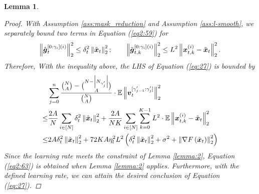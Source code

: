 \documentclass{article}
\theoremstyle{plain}
\newtheorem{lemma}[theorem]{Lemma}
\theoremstyle{definition}
\theoremstyle{remark}
\newcommand{\E}{\mathbb{E}}
\renewcommand{\eqref}[1]{Equation (\ref{#1})}
\newcommand{\bracket}[1]{\left(#1\right)}
\newcommand{\norm}[1]{\left\|#1\right\|_2^2}
\begin{document}
\begin{lemma}
\begin{proof}
With Assumption \ref{ass:mask_reduction} and Assumption \ref{ass:l-smooth}, we separately bound two terms in \eqref{eq2:59} for
\begin{align}
\norm{ \hat{\boldsymbol{g}}^{[0:\gamma_{i}] (i)}_{t} } \leq \delta_t^2 \norm{\x{t}}; \qquad \norm{ \tilde{\boldsymbol{g}}^{[0:\gamma_{i}] (i)}_{t, k} } \leq L^2 \norm{\x{i}{t}{k} - \x{t}}.
\end{align}
Therefore, With the inequality above, the LHS of \eqref{eq:27} is bounded by
\begin{align}
&\sum_{j=0}^n \frac{\binom{N}{A} - \binom{N - \left|\n{j}\right|}{A}}{\binom{N}{A}} \cdot \E\norm{\boldsymbol{v}_{t}^{[\gamma_{j-1}':\gamma_{j}']}}\\
\leq & \frac{2A}{N} \sum_{i \in [N]} \delta_t^2 \norm{\x{t}} + \frac{2A}{NK} \sum_{i \in [N]} \sum_{k=0}^{K-1} L^2 \cdot \E\norm{\x{i}{t}{k} - \x{t}} \label{eq:42} \\
\leq & 2A \delta_t^2 \norm{\x{t}} + 72 K A \eta_l^2 L^2 \bracket{\delta_t^2 \norm{\x{t}} + \sigma^2 + \norm{\grad{t}}} \label{eq2:63}
\end{align}
Since the learning rate meets the constraint of Lemma \ref{lemma:2}, \eqref{eq2:63} is obtained when Lemma \ref{lemma:2} applies. Furthermore, with the defined learning rate, we can attain the desired conclusion of \eqref{eq:27}.
\end{proof}
\end{lemma}
\end{document}
